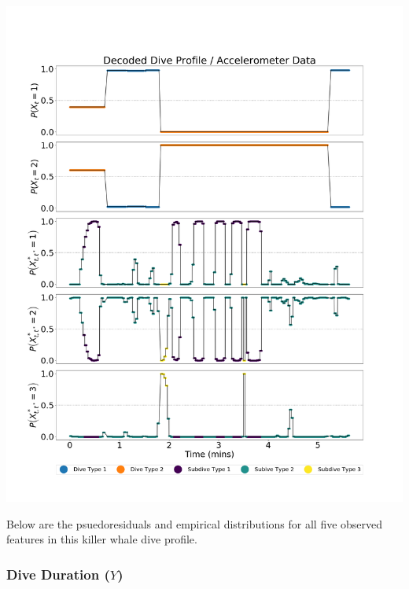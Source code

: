 \documentclass[12pt]{TD-CJS}
\begin{document}
\includegraphics[width=5.5in]{../Plots/HHMM_decoded_states.png}
\newpage

Below are the psuedoresiduals and empirical distributions for all five observed features in this killer whale dive profile. 

\subsubsection{Dive Duration ($Y$)}
\end{document}

